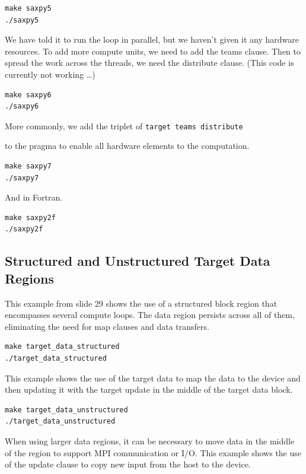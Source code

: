 \documentclass[
]{article}
\let\oldtexttt\texttt
\renewcommand{\texttt}[1]{
  \colorbox{Light}{\oldtexttt{#1}}
}
\begin{document}
\begin{verbatim}
make saxpy5
./saxpy5
\end{verbatim}

We have told it to run the loop in parallel, but we haven't given it any
hardware resources. To add more compute units, we need to add the teams
clause. Then to spread the work across the threads, we need the
distribute clause. (This code is currently not working \ldots)

\begin{verbatim}
make saxpy6
./saxpy6
\end{verbatim}

More commonly, we add the triplet of \texttt{target\ teams\ distribute}
to the pragma to enable all hardware elements to the computation.

\begin{verbatim}
make saxpy7
./saxpy7
\end{verbatim}

And in Fortran.

\begin{verbatim}
make saxpy2f
./saxpy2f
\end{verbatim}

\hypertarget{structured-and-unstructured-target-data-regions}{%
\subsection{Structured and Unstructured Target Data
Regions}\label{structured-and-unstructured-target-data-regions}}

This example from slide 29 shows the use of a structured block region
that encompasses several compute loops. The data region persists across
all of them, eliminating the need for map clauses and data transfers.

\begin{verbatim}
make target_data_structured
./target_data_structured
\end{verbatim}

This example shows the use of the target data to map the data to the
device and then updating it with the target update in the middle of the
target data block.

\begin{verbatim}
make target_data_unstructured
./target_data_unstructured
\end{verbatim}

When using larger data regions, it can be necessary to move data in the
middle of the region to support MPI communication or I/O. This example
shows the use of the update clause to copy new input from the host to
the device.
\end{document}
